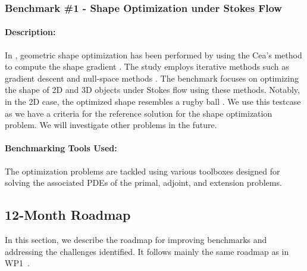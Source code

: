 \subsubsection{Benchmark \#1 - Shape Optimization under Stokes Flow}
\label{sec:WP5:Feelpp:benchmark1}

\paragraph{Description:} In \cite{palazzolo2023shape}, geometric shape optimization has been performed by using the Cea's method to compute the shape gradient \cite{cea_conception_1986}. The study employs iterative methods such as gradient descent and null-space methods \cite{feppon_f_null_2020}. The benchmark focuses on optimizing the shape of 2D and 3D objects under Stokes flow using these methods. Notably, in the 2D case, the optimized shape resembles a rugby ball \cite{pironneau_optimum_1974}. We use this testcase as we have a criteria for the reference solution for the shape optimization problem. We will investigate other problems in the future.

\paragraph{Benchmarking Tools Used:} The optimization problems are tackled using various \Feelpp toolboxes designed for solving the associated PDEs of the primal, adjoint, and extension problems.


\subsection{12-Month Roadmap}
\label{sec:WP5:Feelpp:roadmap}

In this section, we describe the roadmap for improving benchmarks and addressing the challenges identified. 
It follows mainly the same roadmap as in WP1~.

